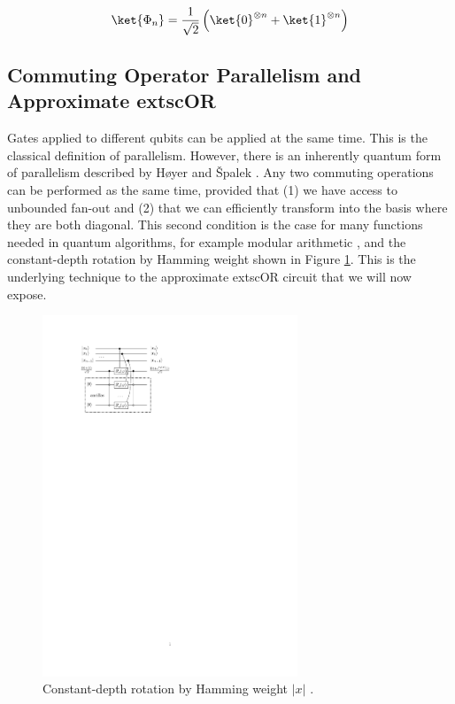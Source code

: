 \begin{equation}
\label{eqn:cat}
\ket{\Phi_n} = \frac{1}{\sqrt{2}}
\left(\ket{0}^{\otimes n} + \ket{1}^{\otimes n}\right)
\end{equation}

\subsection{Commuting Operator Parallelism and Approximate 	extsc{OR}}

Gates applied to different qubits can be applied at the same time. This is
the classical definition of parallelism. However, there is an inherently
quantum form of parallelism described by H{\o}yer and {\v S}palek
\cite{Hoyer2002}. Any two commuting operations
can be performed as the same time, provided that (1) we have access to
unbounded fan-out and (2) that we can efficiently transform
into the basis where they are both diagonal.
This second condition is the case for many
functions needed in quantum algorithms, for example modular arithmetic
\cite{Moore1998}, and the constant-depth rotation by Hamming weight shown
in Figure \ref{fig:rotate-hamming}. This is the underlying technique to
the approximate 	extsc{OR} circuit that we will now expose.

\begin{center}
\begin{figure}
\label{fig:rotate-hamming}
\includegraphics[width=3in]{figures/rotate-hamming.pdf}
\caption{Constant-depth rotation by Hamming weight $|x|$ \cite{Hoyer2002}.}
\end{figure}
\end{center}

